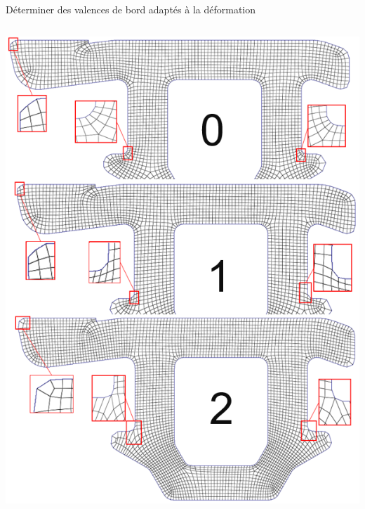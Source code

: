 \begin{frame}{Déterminer des valences de bord adaptés à la déformation}
    \begin{columns}[c] %

        \includegraphics[width=\linewidth]{img/new_images/evolution_verrin.PNG}


\end{columns}
\end{frame}
